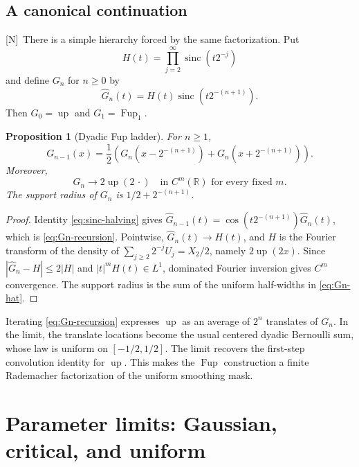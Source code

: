 \documentclass[11pt,oneside]{article}
\newtheorem{proposition}[theorem]{Proposition}
\theoremstyle{definition}
\theoremstyle{remark}
\newcommand{\R}{\mathbb R}
\newcommand{\Up}{\operatorname{up}}
\newcommand{\sinc}{\operatorname{sinc}}
\newcommand{\Nmark}{\textcolor{newgreen}{\textsf{[N]}}}
\begin{document}
\subsection{A canonical continuation}

\Nmark\ There is a simple hierarchy forced by the same factorization.  Put
\begin{equation}
 H(t)=\prod_{j=2}^{\infty}\sinc(t2^{-j})
 \label{eq:H-tail}
\end{equation}
and define $G_n$ for $n\ge0$ by
\begin{equation}
 \widehat G_n(t)=H(t)\sinc(t2^{-(n+1)}).
 \label{eq:Gn-hat}
\end{equation}
Then $G_0=\Up$ and $G_1=\operatorname{Fup}_1$.

\begin{proposition}[Dyadic Fup ladder]
\label{prop:Fup-ladder}
For $n\ge1$,
\begin{equation}
 G_{n-1}(x)=\frac12\left(
 G_n(x-2^{-(n+1)})+G_n(x+2^{-(n+1)})
 \right).
 \label{eq:Gn-recursion}
\end{equation}
Moreover,
\begin{equation}
 G_n\longrightarrow 2\Up(2\,\cdot)
 \quad\text{in }C^m(\R)\text{ for every fixed }m.
 \label{eq:Gn-limit}
\end{equation}
The support radius of $G_n$ is $1/2+2^{-(n+1)}$.
\end{proposition}

\begin{proof}
Identity \eqref{eq:sinc-halving} gives
$\widehat G_{n-1}(t)=\cos(t2^{-(n+1)})\widehat G_n(t)$, which is
\eqref{eq:Gn-recursion}.  Pointwise,
$\widehat G_n(t)\to H(t)$, and $H$ is the Fourier transform of the density of
$\sum_{j\ge2}2^{-j}U_j=X_2/2$, namely $2\Up(2x)$.  Since
$|\widehat G_n-H|\le2|H|$ and $|t|^mH(t)\in L^1$, dominated Fourier inversion gives
$C^m$ convergence.  The support radius is the sum of the uniform half-widths in
\eqref{eq:Gn-hat}.
\end{proof}

Iterating \eqref{eq:Gn-recursion} expresses $\Up$ as an average of $2^n$ translates of
$G_n$.  In the limit, the translate locations become the usual centered dyadic Bernoulli
sum, whose law is uniform on $[-1/2,1/2]$.  The limit recovers the first-step convolution
identity for $\Up$.  This makes the $\operatorname{Fup}$ construction a finite Rademacher
factorization of the uniform smoothing mask.

\section{Parameter limits: Gaussian, critical, and uniform}
\label{sec:parameter-limits}
\end{document}
